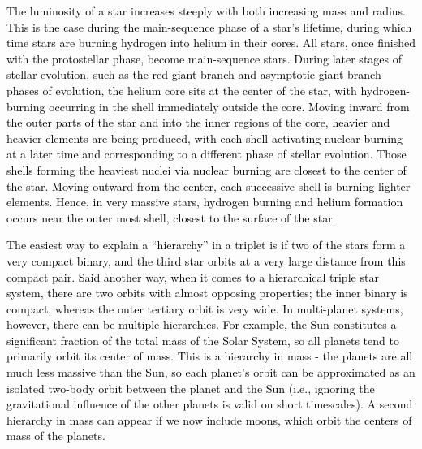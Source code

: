 \documentclass[main.tex]{subfiles}
\begin{document}
\begin{tcolorbox}[sharp corners, colback=blue!30, colframe=blue!80!blue, title=Box \refstepcounter{educhap1}\label{boxchap1:lum2}\ref{boxchap1:lum2} -- Dependence of luminosity on Mass and Radius]
\par \textcolor{black} {The luminosity of a star increases steeply with both increasing mass and radius.  This is the case during the main-sequence phase of a star's lifetime, during which time stars are burning hydrogen into helium in their cores.  All stars, once finished with the protostellar phase, become main-sequence stars.  During later stages of stellar evolution, such as the red giant branch and asymptotic giant branch phases of evolution, the helium core sits at the center of the star, with hydrogen-burning occurring in the shell immediately outside the core.  Moving inward from the outer parts of the star and into the inner regions of the core, heavier and heavier elements are being produced, with each shell activating nuclear burning at a later time and corresponding to a different phase of stellar evolution.  Those shells forming the heaviest nuclei via nuclear burning are closest to the center of the star.  Moving outward from the center, each successive shell is burning lighter elements.  Hence, in very massive stars, hydrogen burning and helium formation occurs near the outer most shell, closest to the surface of the star.}
\end{tcolorbox}

\begin{tcolorbox}[sharp corners, colback=red!30, colframe=red!80!blue, title=Box \refstepcounter{educhap1}\label{boxchap1:oh}\ref{boxchap1:oh} -- Orbital Hierarchies]
\par \textcolor{black}{The easiest way to explain a ``hierarchy'' in a triplet is if two of the stars form a very compact binary, and the third star orbits at a very large distance from this compact pair.  Said another way, when it comes to a hierarchical triple star system, there are two orbits with almost opposing properties; the inner binary is compact, whereas the outer tertiary orbit is very wide.  In multi-planet systems, however, there can be multiple hierarchies.  For example, the Sun constitutes a significant fraction of the total mass of the Solar System, so all planets tend to primarily orbit its center of mass.  This is a hierarchy in mass - the planets are all much less massive than the Sun, so each planet's orbit can be approximated as an isolated two-body orbit between the planet and the Sun (i.e., ignoring the gravitational influence of the other planets is valid on short timescales). A second hierarchy in mass can appear if we now include moons, which orbit the centers of mass of the planets.}
\end{tcolorbox}
\end{document}
